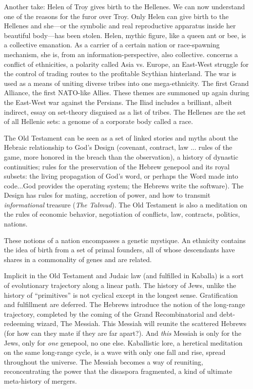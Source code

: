 Another take: Helen of Troy gives birth to
the Hellenes. We can now understand one of
the reasons for the furor over Troy. Only
Helen can give birth to the Hellenes and
she---or the symbolic and real reproductive
apparatus inside her beautiful body---has
been stolen. Helen, mythic figure, like a
queen ant or bee, is a collective emanation.
As a carrier of a certain nation or race-spawning mechanism,
she is, from an information-perspective, also collective.  concerns a conflict of ethnicities, a
polarity called Asia vs. Europe, an East-West
struggle for the control of trading routes to
the profitable Scythian hinterland. The war
is used as a means of uniting diverse tribes
into one mega-ethnicity. The first Grand
Alliance, the first NATO-like Allies. These
themes are summoned up again during the
East-West war against the Persians. The Iliad
includes a brilliant, albeit indirect, essay on
set-theory disguised as a list of tribes. The
Hellenes are the set of all Hellenic sets: a
genome of a corporate body called a race.

The Old Testament can be seen as a set of
linked stories and myths about the Hebraic
relationship to God's Design (covenant, contract, law ... rules of the game, more honored in the breach than the observation), a
history of dynastic continuities; rules for the
preservation of the Hebrew genepool and its
royal subsets: the living propagation of
God's word, or perhaps the Word made into
code...God provides the operating system;
the Hebrews write the software). The Design
has rules for mating, accretion of power, and
how to transmit \emph{informational} treasure (\emph{The
Talmud}). The Old Testament is also a meditation on the rules of economic behavior,
negotiation of conflicts, law, contracts, politics, nations.

These notions of a nation encompasses a
genetic mystique. An ethnicity contains the
idea of birth from a set of primal founders, all
of whose descendants have shares in a commonality of genes and are related.

Implicit in the Old Testament and Judaic
law (and fulfilled in Kaballa) is a sort of
evolutionary trajectory along a linear path.
The history of Jews, unlike the history of
\enquote{primitives} is not cyclical except in the
longest sense. Gratification and fulfillment
are deferred. The Hebrews introduce the
notion of the long-range trajectory, completed
by the coming of the Grand Recombinatorial
and debt-redeeming wizard, The Messiah.
This Messiah will reunite the scattered
Hebrews (for how can they mate if they are
far apart?). And \emph{this} Messiah is only for the
Jews, only for \emph{one} genepool, no one else.
Kaballistic lore, a heretical meditation
on the same long-range cycle, is a wave with
only one fall and rise, spread throughout the
universe. The Messiah becomes a way of
reuniting, reconcentrating the power that
the disaspora fragmented, a kind of ultimate
meta-history of mergers.

